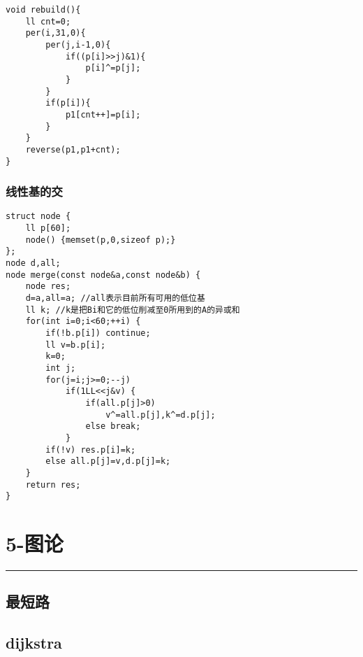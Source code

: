 \documentclass[]{article}
\begin{document}
\begin{verbatim}
void rebuild(){
    ll cnt=0;
    per(i,31,0){
        per(j,i-1,0){
            if((p[i]>>j)&1){
                p[i]^=p[j];
            }
        }
        if(p[i]){
            p1[cnt++]=p[i];
        }
    }
    reverse(p1,p1+cnt);
}
\end{verbatim}

\hypertarget{ux7ebfux6027ux57faux7684ux4ea4}{%
\subsubsection{线性基的交}\label{ux7ebfux6027ux57faux7684ux4ea4}}

\begin{verbatim}
struct node {
    ll p[60];
    node() {memset(p,0,sizeof p);}
};
node d,all;
node merge(const node&a,const node&b) {
    node res;
    d=a,all=a; //all表示目前所有可用的低位基 
    ll k; //k是把Bi和它的低位削减至0所用到的A的异或和 
    for(int i=0;i<60;++i) {
        if(!b.p[i]) continue;
        ll v=b.p[i];
        k=0;
        int j;
        for(j=i;j>=0;--j)
            if(1LL<<j&v) {
                if(all.p[j]>0)
                    v^=all.p[j],k^=d.p[j];
                else break;
            }
        if(!v) res.p[i]=k;
        else all.p[j]=v,d.p[j]=k;
    }
    return res;
}
\end{verbatim}

\hypertarget{ux56feux8bba}{%
\section{5-图论}\label{ux56feux8bba}}

\begin{center}\rule{0.5\linewidth}{0.5pt}\end{center}

\hypertarget{ux6700ux77edux8def}{%
\subsection{最短路}\label{ux6700ux77edux8def}}

\hypertarget{dijkstra}{%
\subsection{dijkstra}\label{dijkstra}}
\end{document}

